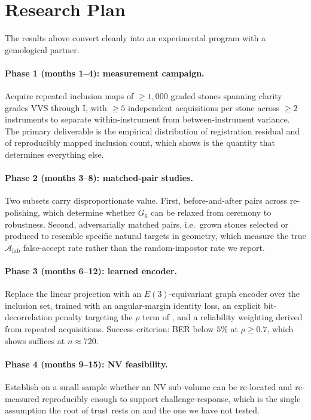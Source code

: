 \documentclass[10pt,twocolumn]{article}
\theoremstyle{remark}
\begin{document}
\section{Research Plan}
\label{sec:plan}

The results above convert cleanly into an experimental program with a
gemological partner.

\paragraph{Phase 1 (months 1--4): measurement campaign.} Acquire repeated
inclusion maps of $\geq 1{,}000$ graded stones spanning clarity grades VVS
through I, with $\geq 5$ independent acquisitions per stone across $\geq 2$
instruments to separate within-instrument from between-instrument variance. The
primary deliverable is the empirical distribution of registration residual and
of reproducibly mapped inclusion count, which  shows is the
quantity that determines everything else.

\paragraph{Phase 2 (months 3--8): matched-pair studies.} Two subsets carry
disproportionate value. First, before-and-after pairs across re-polishing, which
determine whether $G_6$ can be relaxed from ceremony to robustness. Second,
adversarially matched pairs, i.e.\ grown stones selected or produced to resemble
specific natural targets in geometry, which measure the true $\mathcal{A}_{\mathrm{fab}}$
false-accept rate rather than the random-impostor rate we report.

\paragraph{Phase 3 (months 6--12): learned encoder.} Replace the linear
projection with an $E(3)$-equivariant graph encoder over the inclusion set,
trained with an angular-margin identity loss, an explicit bit-decorrelation
penalty targeting the $\rho$ term of , and a reliability
weighting derived from repeated acquisitions. Success criterion: BER below $5\%$
at $\rho \geq 0.7$, which  shows suffices at $n \approx 720$.

\paragraph{Phase 4 (months 9--15): NV feasibility.} Establish on a small sample
whether an NV sub-volume can be re-located and re-measured reproducibly enough
to support challenge-response, which is the single assumption the root of trust
rests on and the one we have not tested.
\end{document}
